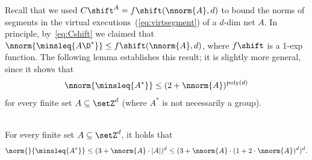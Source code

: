 \noindent
Recall that we used
$C\shift^A=f\shift(\nnorm{A},d)$ to bound the norms of segments in the virtual
executions~(\ref{eq:virtsegment}) of a $d$-dim net $A$. In principle,
by~\eqref{eq:Cshift}
 we claimed  
that $\nnorm{\minsleq{A\D^*}}\leq f\shift(\nnorm{A},d)$, where
$f\shift$ is a 1-exp function. The following lemma establishes this
result; it is slightly more general, since it shows that 
	\[\nnorm{\minsleq{A^*}}\leq (2+\nnorm{A})^{\text{poly}(d)}\] 
for every finite set $A\subseteq \setZ^d$ (where $A^*$ is not necessarily a group).

\begin{lem}\label{lem:Lminbound}
\hfill\\
For every finite set $A\subseteq \setZ^d$, it holds that
	\[\norm{}{\minsleq{A^*}}\leq  (3+\nnorm{A}\cdot |A|)^d\leq
	(3+\nnorm{A}\cdot (1+2\cdot\nnorm{A})^d)^d.\]
\end{lem}
